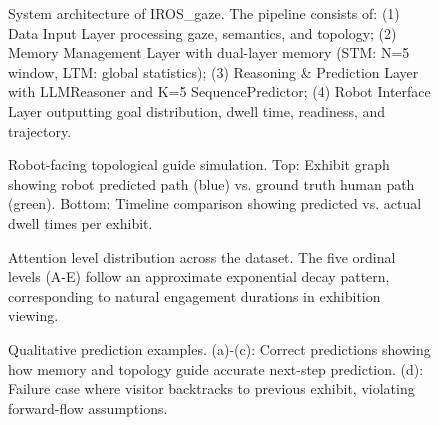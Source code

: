 \begin{figure}[h]
\centering
\caption{System architecture of IROS\_gaze. The pipeline consists of: (1) Data Input Layer processing gaze, semantics, and topology; (2) Memory Management Layer with dual-layer memory (STM: N=5 window, LTM: global statistics); (3) Reasoning \& Prediction Layer with LLMReasoner and K=5 SequencePredictor; (4) Robot Interface Layer outputting goal distribution, dwell time, readiness, and trajectory.}
\label{fig:architecture}
\end{figure}

\begin{figure}[h]
\centering
\caption{Robot-facing topological guide simulation. Top: Exhibit graph showing robot predicted path (blue) vs. ground truth human path (green). Bottom: Timeline comparison showing predicted vs. actual dwell times per exhibit.}
\label{fig:simulation}
\end{figure}

\begin{figure}[h]
\centering
\caption{Attention level distribution across the dataset. The five ordinal levels (A-E) follow an approximate exponential decay pattern, corresponding to natural engagement durations in exhibition viewing.}
\label{fig:attention_dist}
\end{figure}

\begin{figure}[h]
\centering
\caption{Qualitative prediction examples. (a)-(c): Correct predictions showing how memory and topology guide accurate next-step prediction. (d): Failure case where visitor backtracks to previous exhibit, violating forward-flow assumptions.}
\label{fig:qualitative}
\end{figure}
